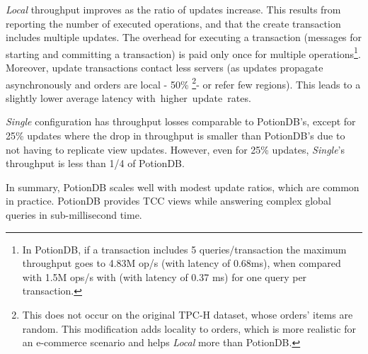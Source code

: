 \documentclass[sigplan,twocolumn,review,anonymous]{acmart}
\begin{document}
\textit{Local} throughput improves as the ratio of updates increase. This results from reporting
the number of executed operations, and that the create transaction includes multiple updates. 
The overhead for executing a transaction (messages for starting and committing a transaction) is paid
only once for multiple operations\footnote{In PotionDB, if a transaction includes 5 queries/transaction the maximum throughput 
goes to 4.83M op/s (with latency of 0.68ms), when compared with 1.5M ops/s with (with latency of 0.37 ms) for one query per transaction.}.  
Moreover, update transactions contact less servers (as updates propagate asynchronously and 
orders are local - 50\% \footnote{This does not occur on the original TPC-H dataset, 
whose orders' items are random. This modification adds locality to orders, which is more realistic for 
an e-commerce scenario and helps \textit{Local} more than PotionDB.}- or refer few regions). 
This leads to a slightly lower average latency \mbox{with higher update rates.}

\textit{Single} configuration has throughput losses comparable to PotionDB's, except for 25\% updates where the drop in throughput is smaller 
than PotionDB's due to not having to replicate view updates.
However, even for 25\% updates, \textit{Single}'s throughput is less than 1/4 of PotionDB.

In summary, PotionDB scales well with modest update ratios, which are common in practice.
PotionDB provides TCC views while answering complex global queries in sub-millisecond time.
\end{document}
